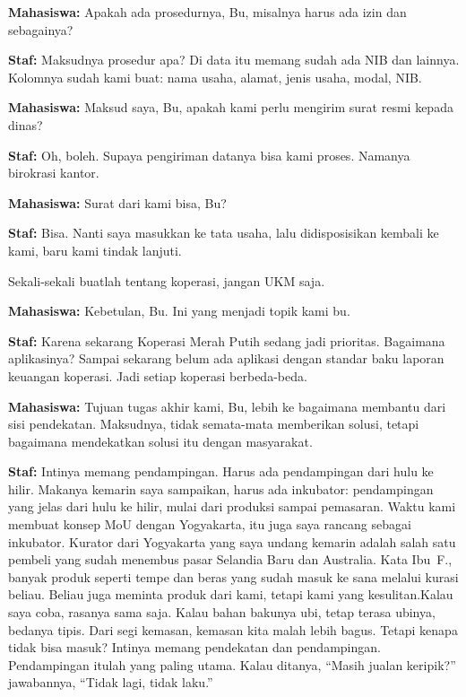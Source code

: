 {\noindent \textbf{Mahasiswa:} Apakah ada prosedurnya, Bu, misalnya harus ada izin dan sebagainya?

\noindent \textbf{Staf:} Maksudnya prosedur apa? Di data itu memang sudah ada NIB dan lainnya. Kolomnya sudah kami buat: nama usaha, alamat, jenis usaha, modal, NIB.

\noindent \textbf{Mahasiswa:} Maksud saya, Bu, apakah kami perlu mengirim surat resmi kepada dinas?

\noindent \textbf{Staf:} Oh, boleh. Supaya pengiriman datanya bisa kami proses. Namanya birokrasi kantor.

\noindent \textbf{Mahasiswa:} Surat dari kami bisa, Bu?

\noindent \textbf{Staf:} Bisa. Nanti saya masukkan ke tata usaha, lalu didisposisikan kembali ke kami, baru kami tindak lanjuti.

\noindent Sekali-sekali buatlah tentang koperasi, jangan UKM saja.

\noindent \textbf{Mahasiswa:} Kebetulan, Bu. Ini yang menjadi topik kami bu.

\noindent \textbf{Staf:} Karena sekarang Koperasi Merah Putih sedang jadi prioritas. Bagaimana aplikasinya? Sampai sekarang belum ada aplikasi dengan standar baku laporan keuangan koperasi. Jadi setiap koperasi berbeda-beda.

\noindent \textbf{Mahasiswa:} Tujuan tugas akhir kami, Bu, lebih ke bagaimana membantu dari sisi pendekatan. Maksudnya, tidak semata-mata memberikan solusi, tetapi bagaimana mendekatkan solusi itu dengan masyarakat.

\noindent \textbf{Staf:} Intinya memang pendampingan. Harus ada pendampingan dari hulu ke hilir. Makanya kemarin saya sampaikan, harus ada inkubator: pendampingan yang jelas dari hulu ke hilir, mulai dari produksi sampai pemasaran. Waktu kami membuat konsep MoU dengan Yogyakarta, itu juga saya rancang sebagai inkubator. Kurator dari Yogyakarta yang saya undang kemarin adalah salah satu pembeli yang sudah menembus pasar Selandia Baru dan Australia. Kata Ibu~F., banyak produk seperti tempe dan beras yang sudah masuk ke sana melalui kurasi beliau. Beliau juga meminta produk dari kami, tetapi kami yang kesulitan.Kalau saya coba, rasanya sama saja. Kalau bahan bakunya ubi, tetap terasa ubinya, bedanya tipis. Dari segi kemasan, kemasan kita malah lebih bagus. Tetapi kenapa tidak bisa masuk? Intinya memang pendekatan dan pendampingan. Pendampingan itulah yang paling utama. Kalau ditanya, ``Masih jualan keripik?'' jawabannya, ``Tidak lagi, tidak laku.''

}
